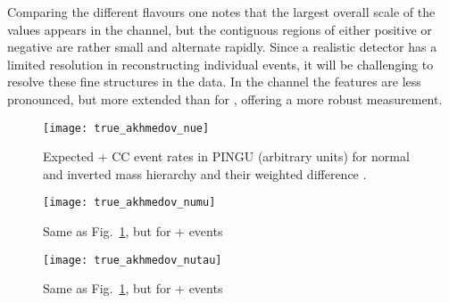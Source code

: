 Comparing the different flavours one notes that the largest overall scale of the
\delchi values appears in the \numu channel, but the contiguous regions of
either positive or negative \delchi are rather small and alternate rapidly.
Since a realistic detector has a limited resolution in reconstructing individual
events, it will be challenging to resolve these fine structures in the data. In
the \nue channel the features are less pronounced, but more extended than for
\numu, offering a more robust measurement.

\begin{figure}[p]
 \centering
 \texttt{[image: true\_akhmedov\_nue]}
 \caption{Expected \nue + \nuebar CC event rates in PINGU (arbitrary units) for
    normal and inverted mass hierarchy and their weighted difference \delchi.}
 \label{fig:true_akhmedov_nue}
\end{figure}
\begin{figure}[p]
 \centering
 \texttt{[image: true\_akhmedov\_numu]}
 \caption{Same as Fig.~\ref{fig:true_akhmedov_nue}, but for \numu + \numubar
    events}
 \label{fig:true_akhmedov_numu}
\end{figure}
\begin{figure}[p]
 \centering
 \texttt{[image: true\_akhmedov\_nutau]}
 \caption{Same as Fig.~\ref{fig:true_akhmedov_nue}, but for \nutau + \nutaubar
    events}
 \label{fig:true_akhmedov_nutau}
\end{figure}
